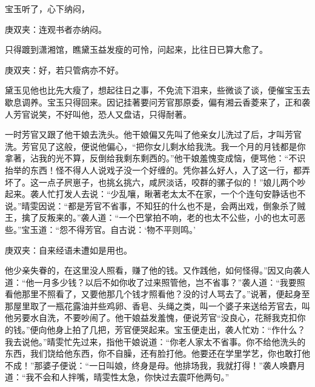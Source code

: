 \begin{parag}
    宝玉听了，心下纳闷，\begin{note}庚双夹：连观书者亦纳闷。\end{note}只得踱到潇湘馆，瞧黛玉益发瘦的可怜，问起来，比往日已算大愈了。\begin{note}庚双夹：好，若只管病亦不好。\end{note}黛玉见他也比先大瘦了，想起往日之事，不免流下泪来，些微谈了谈，便催宝玉去歇息调养。宝玉只得回来。因记挂著要问芳官那原委，偏有湘云香菱来了，正和袭人芳官说笑，不好叫他，恐人又盘诘，只得耐著。
\end{parag}


\begin{parag}
    一时芳官又跟了他干娘去洗头。他干娘偏又先叫了他亲女儿洗过了后，才叫芳官洗。芳官见了这般，便说他偏心，“把你女儿剩水给我洗。我一个月的月钱都是你拿著，沾我的光不算，反倒给我剩东剩西的。”他干娘羞愧变成恼，便骂他：“不识抬举的东西！怪不得人人说戏子没一个好缠的。凭你甚么好人，入了这一行，都弄坏了。这一点子屄崽子，也挑幺挑六，咸屄淡话，咬群的骡子似的！”娘儿两个吵起来。袭人忙打发人去说：“少乱嚷，瞅著老太太不在家，一个个连句安静话也不说。”晴雯因说：“都是芳官不省事，不知狂的什么也不是，会两出戏，倒象杀了贼王，擒了反叛来的。”袭人道：“一个巴掌拍不响，老的也太不公些，小的也太可恶些。”宝玉道：“怨不得芳官。自古说：‘物不平则鸣。’\begin{note}庚双夹：自来经语未遭如是用也。\end{note}他少亲失眷的，在这里没人照看，赚了他的钱。又作践他，如何怪得。”因又向袭人道：“他一月多少钱？以后不如你收了过来照管他，岂不省事？”袭人道：“我要照看他那里不照看了，又要他那几个钱才照看他？没的讨人骂去了。”说著，便起身至那屋里取了一瓶花露油并些鸡卵、香皂、头绳之类，叫一个婆子来送给芳官去，叫他另要水自洗，不要吵闹了。他干娘益发羞愧，便说芳官“没良心，花掰我克扣你的钱。”便向他身上拍了几把，芳官便哭起来。宝玉便走出，袭人忙劝：“作什么？我去说他。”晴雯忙先过来，指他干娘说道：“你老人家太不省事。你不给他洗头的东西，我们饶给他东西，你不自臊，还有脸打他。他要还在学里学艺，你也敢打他不成！”那婆子便说：“一日叫娘，终身是母。他排场我，我就打得！”袭人唤麝月道：“我不会和人拌嘴，晴雯性太急，你快过去震吓他两句。” 
\end{parag}
